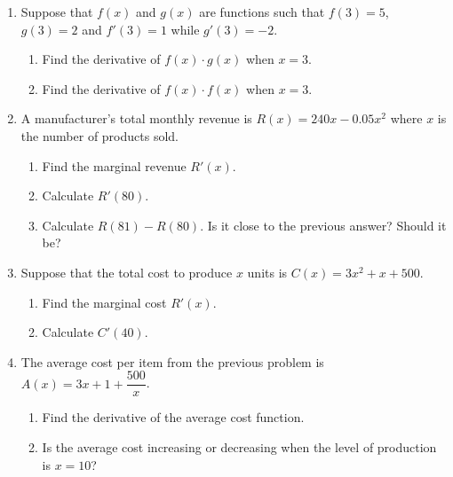 \documentclass[10pt]{article}
\begin{document}
\begin{enumerate}
\setcounter{enumi}{\theenumCount}
\item Suppose that $f(x)$ and $g(x)$ are functions such that $f(3) = 5$, $g(3) = 2$ and $f'(3) = 1$ while $g'(3) = -2$. 
\begin{enumerate}
\item Find the derivative of $f(x) \cdot g(x)$ when $x = 3$. 
\vfill
\item Find the derivative of $f(x) \cdot f(x)$ when $x = 3$. 
\vfill
\end{enumerate}

\newpage
\item A manufacturer's total monthly revenue is $R(x) = 240 x - 0.05 x^2$ where $x$ is the number of products sold. 
\begin{enumerate}
\item Find the marginal revenue $R'(x)$. 
\vfill
\item Calculate $R'(80)$.  
\vfill

\item Calculate $R(81) - R(80)$.  Is it close to the previous answer?  Should it be? 
\vfill

\end{enumerate}


\item Suppose that the total cost to produce $x$ units is $C(x) = 3x^2 + x + 500$.  
\begin{enumerate}
\item Find the marginal cost $R'(x)$. 
\vfill

\item Calculate $C'(40)$.  
\vfill
\end{enumerate}

\item The average cost per item from the previous problem is $A(x) = 3x + 1 + \dfrac{500}{x}$.  
\begin{enumerate}
\item Find the derivative of the average cost function. 
\vfill

\item Is the average cost increasing or decreasing when the level of production is $x=10$?  
\vfill
\end{enumerate}

\end{enumerate}


\vfill

\end{document}
